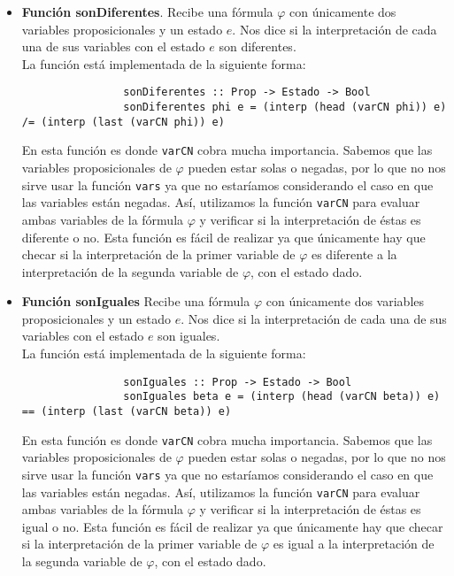 \documentclass[letterpaper,12pt]{article}
\begin{document}
\begin{itemize}
\begin{itemize}
            \item \textbf{Función sonDiferentes}. Recibe una fórmula $\varphi$ 
            con únicamente dos variables proposicionales y un estado $e$. Nos 
            dice si la interpretación de cada una de sus variables con el 
            estado $e$ son diferentes.\\
            La función está implementada de la siguiente forma:
            \begin{lstlisting}
                sonDiferentes :: Prop -> Estado -> Bool
                sonDiferentes phi e = (interp (head (varCN phi)) e) /= (interp (last (varCN phi)) e)
            \end{lstlisting}

            En esta función es donde \texttt{varCN} cobra mucha importancia. 
            Sabemos que las variables proposicionales de $\varphi$ 
            pueden estar solas o negadas, por lo que no nos sirve usar la 
            función \texttt{vars} ya que no estaríamos considerando el
            caso en que las variables están negadas. Así, utilizamos la 
            función \texttt{varCN} para evaluar ambas variables de la 
            fórmula $\varphi$ y verificar si la interpretación de éstas es 
            diferente o no. Esta función es fácil de realizar ya que 
            únicamente hay que checar si la interpretación de la primer 
            variable de $\varphi$ es diferente a la interpretación de la 
            segunda variable de $\varphi$, con el estado dado.

            \item \textbf{Función sonIguales} Recibe una fórmula $\varphi$
            con únicamente dos variables proposicionales y un estado $e$. Nos 
            dice si la interpretación de cada una de sus variables con el 
            estado $e$ son iguales. \\
            La función está implementada de la siguiente forma:
            \begin{lstlisting}
                sonIguales :: Prop -> Estado -> Bool
                sonIguales beta e = (interp (head (varCN beta)) e) == (interp (last (varCN beta)) e)
            \end{lstlisting}

            En esta función es donde \texttt{varCN} cobra mucha importancia. 
            Sabemos que las variables proposicionales de $\varphi$ 
            pueden estar solas o negadas, por lo que no nos sirve usar la 
            función \texttt{vars} ya que no estaríamos considerando el
            caso en que las variables están negadas. Así, utilizamos la 
            función \texttt{varCN} para evaluar ambas variables de la 
            fórmula $\varphi$ y verificar si la interpretación de éstas es 
            igual o no. Esta función es fácil de realizar ya que 
            únicamente hay que checar si la interpretación de la primer 
            variable de $\varphi$ es igual a la interpretación de la 
            segunda variable de $\varphi$, con el estado dado.
        \end{itemize}


\end{itemize}
\end{document}
